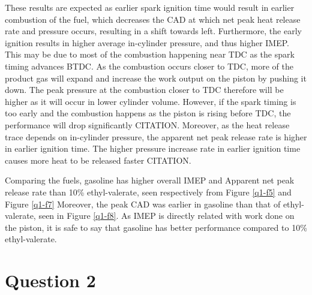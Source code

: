 \documentclass[11pt]{article}
\begin{document}
These results are expected as earlier spark ignition time would result in earlier combustion of the fuel, which decreases the CAD at which net peak heat release rate and pressure occurs, resulting in a shift towards left. Furthermore, the early ignition results in higher average in-cylinder pressure, and thus higher IMEP. This may be due to most of the combustion happening near TDC as the spark timing advances BTDC. As the combustion occurs closer to TDC, more of the product gas will expand and increase the work output on the piston by pushing it down. The peak pressure at the combustion closer to TDC therefore will be higher as it will occur in lower cylinder volume. However, if the spark timing is too early and the combustion happens as the piston is rising before TDC, the performance will drop significantly CITATION. Moreover, as the heat release trace depends on in-cylinder pressure, the apparent net peak release rate is higher in earlier ignition time. The higher pressure increase rate in earlier ignition time causes more heat to be released faster CITATION. 

Comparing the fuels, gasoline has higher overall IMEP and Apparent net peak release rate than 10\% ethyl-valerate, seen respectively from Figure \ref{q1-f5} and Figure \ref{q1-f7} Moreover, the peak CAD was earlier in gasoline than that of ethyl-valerate, seen in Figure \ref{q1-f8}. As IMEP is directly related with work done on the piston, it is safe to say that gasoline has better performance compared to 10\% ethyl-valerate. 
\section*{Question 2}
\end{document}
